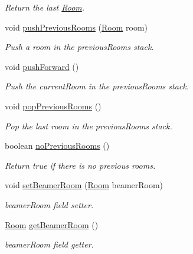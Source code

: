 \begin{DoxyCompactItemize}
\begin{DoxyCompactList}\small\item\em Return the last \hyperlink{classpkg__world_1_1Room}{Room}. \end{DoxyCompactList}\item 
void \hyperlink{classpkg__world_1_1Player_a6b419da985921727891cee03e4a7e755}{push\-Previous\-Rooms} (\hyperlink{classpkg__world_1_1Room}{Room} room)
\begin{DoxyCompactList}\small\item\em Push a room in the previous\-Rooms stack. \end{DoxyCompactList}\item 
void \hyperlink{classpkg__world_1_1Player_af97dc9ce2806115a09ab6a3ba08ed673}{push\-Forward} ()
\begin{DoxyCompactList}\small\item\em Push the current\-Room in the previous\-Rooms stack. \end{DoxyCompactList}\item 
void \hyperlink{classpkg__world_1_1Player_a4ef9377c34206c64ef1086de669ca5f1}{pop\-Previous\-Rooms} ()
\begin{DoxyCompactList}\small\item\em Pop the last room in the previous\-Rooms stack. \end{DoxyCompactList}\item 
boolean \hyperlink{classpkg__world_1_1Player_abe1633071742e8825d40317150f66835}{no\-Previous\-Rooms} ()
\begin{DoxyCompactList}\small\item\em Return true if there is no previous rooms. \end{DoxyCompactList}\item 
void \hyperlink{classpkg__world_1_1Player_a6dc6248fa7cbe281e9a7c5d6b86f242c}{set\-Beamer\-Room} (\hyperlink{classpkg__world_1_1Room}{Room} beamer\-Room)
\begin{DoxyCompactList}\small\item\em beamer\-Room field setter. \end{DoxyCompactList}\item 
\hyperlink{classpkg__world_1_1Room}{Room} \hyperlink{classpkg__world_1_1Player_a81893b37cd26426863087f353f8be3ab}{get\-Beamer\-Room} ()
\begin{DoxyCompactList}\small\item\em beamer\-Room field getter. \end{DoxyCompactList}\item 

\end{DoxyCompactItemize}
